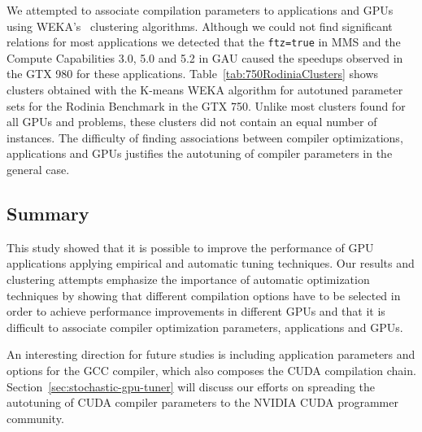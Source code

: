 We attempted to associate compilation parameters to applications and GPUs using
WEKA's~\cite{holmes1994weka} clustering algorithms. Although we could not find
significant relations for most applications we detected that the
\texttt{ftz=true} in MMS and the Compute Capabilities 3.0, 5.0 and 5.2 in GAU
caused the speedups observed in the GTX 980 for these applications.
Table~\ref{tab:750RodiniaClusters} shows clusters obtained with the K-means
WEKA algorithm for autotuned parameter sets for the Rodinia Benchmark in the
GTX 750. Unlike most clusters found for all GPUs and problems, these clusters
did not contain an equal number of instances. The difficulty of finding
associations between compiler optimizations, applications and GPUs justifies
the autotuning of compiler parameters in the general case.

\subsection{Summary}
\label{subsec:GPUconcl}

This study showed that it is possible to improve the performance of GPU
applications applying empirical and automatic tuning techniques. Our results
and clustering attempts emphasize the importance of automatic optimization
techniques by showing that different compilation options have to be selected in
order to achieve performance improvements in different GPUs and that it is
difficult to associate compiler optimization parameters, applications and GPUs.

An interesting direction for future studies is including application parameters
and options for the GCC compiler, which also composes the CUDA compilation
chain. Section~\ref{sec:stochastic-gpu-tuner} will discuss our efforts on spreading the autotuning
of CUDA compiler parameters to the NVIDIA CUDA programmer community.
